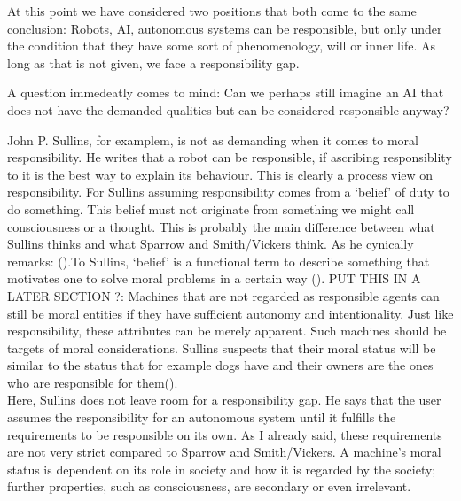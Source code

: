 \documentclass{article}
\newcounter{example}
\begin{document}
At this point we have considered two positions that both come to the same
conclusion: Robots, AI, autonomous systems can be responsible, but only under
the condition that they have some sort of phenomenology, will or inner life. As long
as that is not given, we face a responsibility gap.


A question immedeatly comes to mind: Can we perhaps still imagine an AI that
does not have the demanded qualities but can be considered responsible anyway?

John P. Sullins, for examplem, is not as demanding when it comes to moral responsibility. 
He writes that a robot can be responsible, if ascribing responsiblity to it
is the best way to explain its behaviour. This is clearly a process view on
responsibility. For Sullins assuming responsibility
comes from a `belief' of duty to do something. This belief must not originate
from something we might call consciousness or a thought. This is probably the main
difference between what Sullins thinks and what Sparrow and Smith/Vickers think.
As he cynically remarks: (\cite[p. 159]{sullins2006robot}).To Sullins, `belief' is a
functional term to describe something that motivates one to solve moral problems
in a certain way (\cite[p. 159]{sullins2006robot}).
PUT THIS IN A LATER SECTION ?:
Machines that are not regarded as responsible agents can still be moral entities
if they have sufficient autonomy and intentionality. Just like responsibility,
these attributes can be merely apparent. Such machines should be targets of
moral considerations. Sullins suspects that their moral status will be similar
to the status that for example dogs have and their owners are the ones who are
responsible for them(\cite[p. 159]{sullins2006robot}).\\
Here, Sullins does not leave room for a responsibility gap. He says that the
user assumes the responsibility for an autonomous system until it fulfills the
requirements to be responsible on its own. As I already said, these requirements
are not very strict compared to Sparrow and Smith/Vickers. A machine's moral
status is dependent on its role in society and how it is regarded by the
society; further properties, such as consciousness, are secondary or even
irrelevant.
\end{document}
